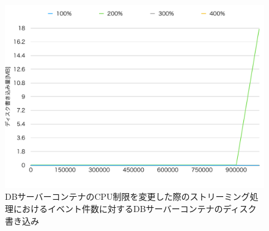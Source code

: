 \documentclass[../../../../../main]{subfiles}
\begin{document}
    \begin{figure}[H]
        \centering
        \includegraphics[width=12cm]{graph}
        \caption{DBサーバーコンテナのCPU制限を変更した際のストリーミング処理におけるイベント件数に対するDBサーバーコンテナのディスク書き込み}
        \label{fig:stream-change-db-cpu-limit-db-disk-in-app_4_8192-db_1024}
    \end{figure}
\end{document}
